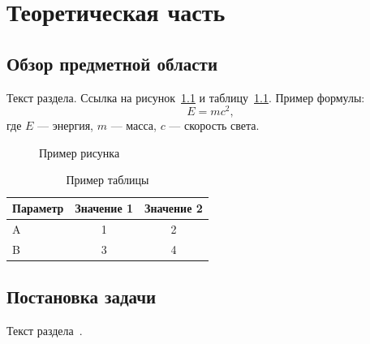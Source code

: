 \chapter{Теоретическая часть}

\section{Обзор предметной области}

Текст раздела. Ссылка на рисунок~\ref{fig:example} и таблицу~\ref{tab:example}.
Пример формулы:
\begin{equation}
  E = mc^2,
  \label{eq:einstein}
\end{equation}
где $E$ --- энергия, $m$ --- масса, $c$ --- скорость света.

\begin{figure}[H]
  \centering
  \caption{Пример рисунка}
  \label{fig:example}
\end{figure}

\begin{table}[H]
  \caption{Пример таблицы}
  \label{tab:example}
  \centering
  \begin{tabular}{|l|c|c|}
    \hline
    Параметр & Значение 1 & Значение 2 \\ \hline
    A & 1 & 2 \\ \hline
    B & 3 & 4 \\ \hline
  \end{tabular}
\end{table}

\section{Постановка задачи}

Текст раздела~\cite{gost7322017}.
